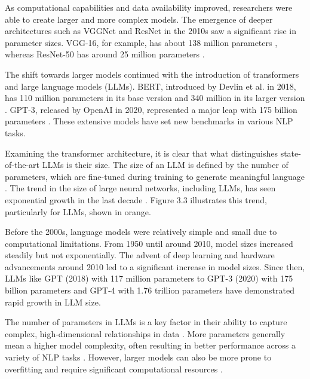 As computational capabilities and data availability improved, researchers were able to create larger and more complex models. The emergence of deeper architectures such as VGGNet and ResNet in the 2010s saw a significant rise in parameter sizes. VGG-16, for example, has about 138 million parameters \cite{simonyan2014very}, whereas ResNet-50 has around 25 million parameters \cite{he2016deep}.

The shift towards larger models continued with the introduction of transformers and large language models (LLMs). BERT, introduced by Devlin et al. in 2018, has 110 million parameters in its base version and 340 million in its larger version \cite{devlin2018bert}. GPT-3, released by OpenAI in 2020, represented a major leap with 175 billion parameters \cite{brown2020language}. These extensive models have set new benchmarks in various NLP tasks.

Examining the transformer architecture, it is clear that what distinguishes state-of-the-art LLMs is their size. The size of an LLM is defined by the number of parameters, which are fine-tuned during training to generate meaningful language \cite{zhao2023survey, naveed2023comprehensive}. The trend in the size of large neural networks, including LLMs, has seen exponential growth in the last decade \cite{sadiq2023generative}. Figure 3.3 illustrates this trend, particularly for LLMs, shown in orange.


Before the 2000s, language models were relatively simple and small due to computational limitations. From 1950 until around 2010, model sizes increased steadily but not exponentially. The advent of deep learning and hardware advancements around 2010 led to a significant increase in model sizes. Since then, LLMs like GPT (2018) with 117 million parameters to GPT-3 (2020) with 175 billion parameters and GPT-4 with 1.76 trillion parameters have demonstrated rapid growth in LLM size.

The number of parameters in LLMs is a key factor in their ability to capture complex, high-dimensional relationships in data \cite{zhao2023survey}. More parameters generally mean a higher model complexity, often resulting in better performance across a variety of NLP tasks \cite{villalobos2022machine}. However, larger models can also be more prone to overfitting and require significant computational resources \cite{wei2022emergent}.

